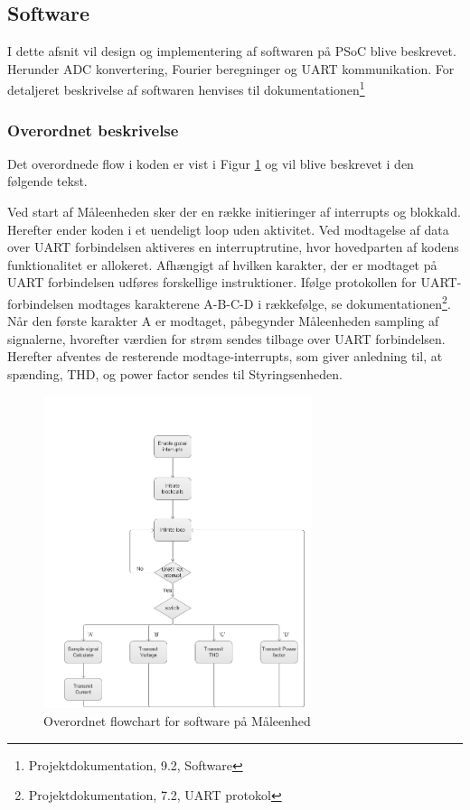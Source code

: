 
\subsection{Software}
I dette afsnit vil design og implementering af softwaren på PSoC blive beskrevet. Herunder ADC konvertering, Fourier beregninger og  UART kommunikation. For detaljeret beskrivelse af softwaren henvises til dokumentationen\footnote{Projektdokumentation, 9.2, Software}

\subsubsection{Overordnet beskrivelse}
Det overordnede flow i koden er vist i Figur \ref{fig:MEflowchart} og vil blive beskrevet i den følgende tekst.  

Ved start af Måleenheden sker der en række initieringer af interrupts og blokkald. Herefter ender koden i et uendeligt loop uden aktivitet. Ved modtagelse af data over UART forbindelsen aktiveres en interruptrutine, hvor hovedparten af kodens funktionalitet er allokeret. 
Afhængigt af hvilken karakter, der er modtaget på UART forbindelsen udføres forskellige instruktioner. Ifølge protokollen for UART-forbindelsen modtages karakterene A-B-C-D i rækkefølge, se dokumentationen\footnote{Projektdokumentation, 7.2, UART protokol}.
Når den første karakter A er modtaget, påbegynder Måleenheden sampling af signalerne, hvorefter værdien for strøm sendes tilbage over UART forbindelsen. Herefter afventes de resterende modtage-interrupts, som giver anledning til, at spænding, THD, og power factor sendes til Styringsenheden. 
\begin{figure}[H] %
	\centering
	\includegraphics[width=0.7\textwidth]{Figure/MEflowchart.png}
	\caption{Overordnet flowchart for software på Måleenhed}
	\label{fig:MEflowchart}
\end{figure}




